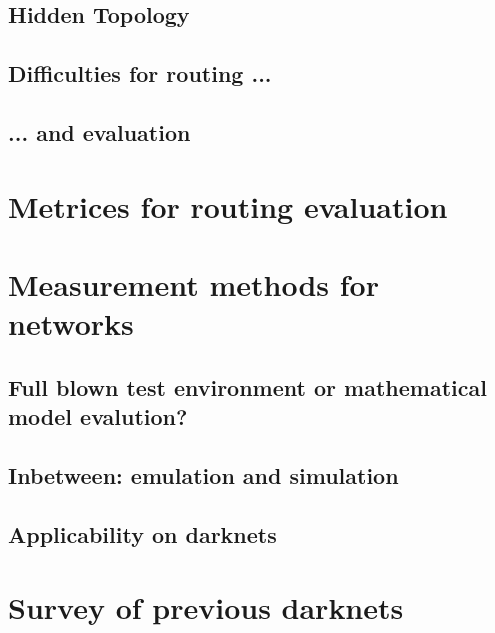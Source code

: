 \subsection{Hidden Topology}

\subsection{Difficulties for routing ...}

\subsection{... and evaluation}


\section{Metrices for routing evaluation}



\section{Measurement methods for networks}

\subsection{Full blown test environment or mathematical model evalution?}

\subsection{Inbetween: emulation and simulation}

\subsection{Applicability on darknets}



\section{Survey of previous darknets}


